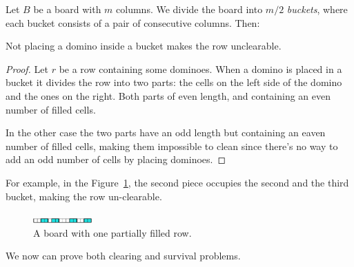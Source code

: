 Let $B$ be a board with $m$ columns. We divide the board into $m/2$ \emph{buckets}, where each bucket consists of a pair of consecutive columns. Then:

\begin{lemma}   
    Not placing a domino inside a bucket makes the row unclearable.
\end{lemma}
\begin{proof}
    Let $r$ be a row containing some dominoes. When a domino is placed in a bucket it divides the row into two parts: the cells on the left side of the domino and the ones on the right. Both parts of even length, and containing an even number of filled cells.

    In the other case the two parts have an odd length but containing an eaven number of filled cells, making them impossible to clean
    since there's no way to add an odd number of cells by placing dominoes.
\end{proof}

For example, in the Figure~\ref{dom:buckets}, the second piece occupies the second and the third bucket, making the row un-clearable. 

\begin{figure}[h]
    \centering
    \includegraphics[width=0.2\textwidth]{./pictures/dominoes/buckets.pdf}
    \caption{A board with one partially filled row.}
    \label{dom:buckets} 
\end{figure}


We now can prove both clearing and survival problems.

